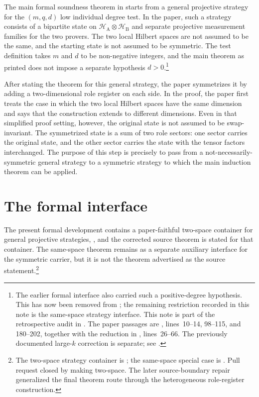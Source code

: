 \documentclass{article}
\begin{document}
The main formal soundness theorem in \cite[Section~\emph{The test}]{Ji2020LowIndividualDegree}
starts from a general projective strategy for the $(m,q,d)$ low individual degree
test. In the paper, such a strategy consists of a bipartite state on
$\mathcal H_{\mathrm A}\otimes\mathcal H_{\mathrm B}$ and separate projective
measurement families for the two provers. The two local Hilbert spaces are not
assumed to be the same, and the starting state is not assumed to be symmetric.
The test definition takes $m$ and $d$ to be non-negative integers, and the
main theorem as printed does not impose a separate hypothesis $d>0$.\footnote{The
earlier formal interface also carried such a positive-degree hypothesis.  This
has now been removed from ; the remaining
restriction recorded in this note is the same-space strategy interface.  This
note is part of the retrospective audit in . The paper passages are
, lines~10--14, 98--115, and
180--202, together with the reduction in
, lines~26--66. The previously
documented large-$k$ correction is separate; see
.}

After stating the theorem for this general strategy, the paper symmetrizes it by
adding a two-dimensional role register on each side. In the proof, the paper
first treats the case in which the two local Hilbert spaces have the same
dimension and says that the construction extends to different dimensions. Even
in that simplified proof setting, however, the original state is not assumed to
be swap-invariant. The symmetrized state is a sum of two role sectors: one sector
carries the original state, and the other sector carries the state with the
tensor factors interchanged. The purpose of this step is precisely to pass from
a not-necessarily-symmetric general strategy to a symmetric strategy to which the
main induction theorem can be applied.

\section{The formal interface}

The present formal development contains a paper-faithful two-space container
for general projective strategies, , and the
corrected source theorem
 is stated for that
container.  The same-space theorem 
remains as a separate auxiliary interface for the symmetric carrier, but it is
not the theorem advertised as the source statement.\footnote{The two-space
strategy container is ; the same-space special
case is .  Pull request 
closed  by making  two-space.  The later
source-boundary repair generalized the final theorem route through the
heterogeneous role-register construction.}
\end{document}
